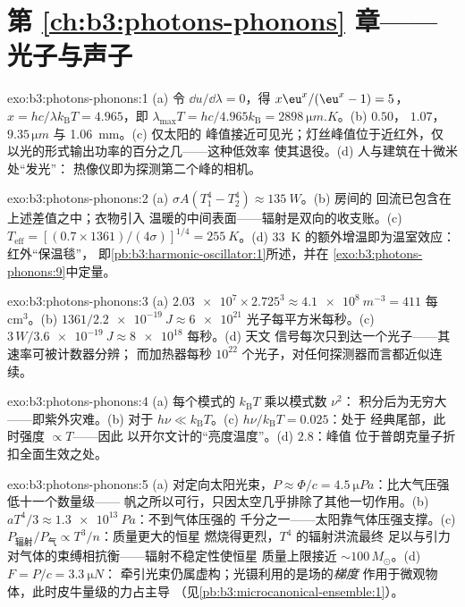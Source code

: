 \section*{第 \ref{ch:b3:photons-phonons} 章——光子与声子}

\begin{solution}{exo:b3:photons-phonons:1}
(a) 令 $\dd u/\dd\lambda = 0$，得 $x\eu^x/(\eu^x - 1) = 5$，
$x = hc/\lambda k_{\text{B}}T = 4.965$，即 $\lambda_{\max}T =
hc/4.965k_{\text{B}} = \qty{2898}{\micro m.K}$。(b) $0.50$，
$1.07$，$9.35\,\unit{\micro m}$ 与 \qty{1.06}{mm}。(c) 仅太阳的
峰值接近可见光；灯丝峰值位于近红外，仅
以光的形式输出功率的百分之几——这种低效率
使其退役。(d) 人与建筑在十微米处“发光”：
热像仪即为探测第二个峰的相机。
\end{solution}

\begin{solution}{exo:b3:photons-phonons:2}
(a) $\sigma A(T_1^4 - T_2^4) \approx \qty{135}{W}$。(b) 房间的
回流已包含在上述差值之中；衣物引入
温暖的中间表面——辐射是双向的收支账。(c)
$T_{\text{eff}} = [(0.7 \times 1361)/(4\sigma)]^{1/4} =
\qty{255}{K}$。(d) \qty{33}{K} 的额外增温即为温室效应：
红外“保温毯”，
即\cref{pb:b3:harmonic-oscillator:1}所述，并在
\cref{exo:b3:photons-phonons:9}中定量。
\end{solution}

\begin{solution}{exo:b3:photons-phonons:3}
(a) $\num{2.03e7} \times 2.725^3 \approx \qty{4.1e8}{m^{-3}} =
411$ 每 cm$^3$。(b) $1361/\qty{2.2e-19}{J} \approx
\num{6e21}$ 光子每平方米每秒。(c) $3\,\unit{W}/
\qty{3.6e-19}{J} \approx \num{8e18}$ 每秒。(d) 天文
信号每次只到达一个光子——其速率可被计数器分辨；
而加热器每秒 $10^{22}$ 个光子，对任何探测器而言都近似连续。
\end{solution}

\begin{solution}{exo:b3:photons-phonons:4}
(a) 每个模式的 $k_{\text{B}}T$ 乘以模式数 $\nu^2$：
积分后为无穷大——即紫外灾难。(b) 对于 $h\nu \ll
k_{\text{B}}T$。(c) $h\nu/k_{\text{B}}T = 0.025$：处于
经典尾部，此时强度 $\propto T$——因此
以开尔文计的“亮度温度”。(d) $2.8$：峰值
位于普朗克量子折扣全面生效之处。
\end{solution}

\begin{solution}{exo:b3:photons-phonons:5}
(a) 对定向太阳光束，$P \approx \Phi/c =
\qty{4.5}{\micro Pa}$：比大气压强低十一个数量级——
帆之所以可行，只因太空几乎排除了其他一切作用。(b)
$aT^4/3 \approx \qty{1.3e13}{Pa}$：不到气体压强的
千分之一——太阳靠气体压强支撑。(c)
$P_{\text{辐射}}/P_{\text{气}} \propto T^3/n$：质量更大的恒星
燃烧得更烈，$T^4$ 的辐射洪流最终
足以与引力对气体的束缚相抗衡——辐射不稳定性使恒星
质量上限接近 $\sim100\,M_\odot$。(d) $F = P/c = \qty{3.3}{\micro N}$：
牵引光束仍属虚构；光镊利用的是场的\emph{梯度}
作用于微观物体，此时皮牛量级的力占主导
（见\cref{pb:b3:microcanonical-ensemble:1}）。
\end{solution}

